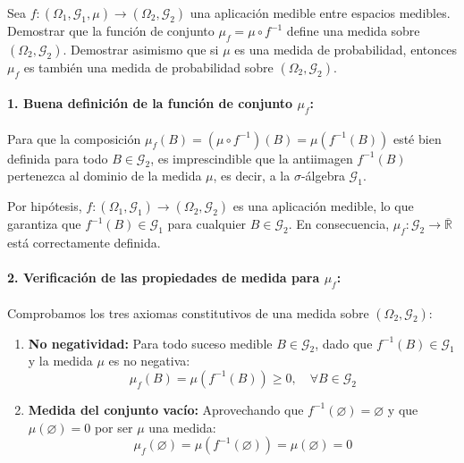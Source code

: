 \newpage
\begin{problema}
Sea $f : (\Omega_1, \mathcal{G}_1, \mu) \to (\Omega_2, \mathcal{G}_2)$ una aplicación medible entre espacios medibles. Demostrar que la función de conjunto $\mu_f = \mu \circ f^{-1}$ define una medida sobre $(\Omega_2, \mathcal{G}_2)$. Demostrar asimismo que si $\mu$ es una medida de probabilidad, entonces $\mu_f$ es también una medida de probabilidad sobre $(\Omega_2, \mathcal{G}_2)$.

\tcblower

\paragraph{1. Buena definición de la función de conjunto $\mu_f$:}
Para que la composición $\mu_f(B) = (\mu \circ f^{-1})(B) = \mu(f^{-1}(B))$ esté bien definida para todo $B \in \mathcal{G}_2$, es imprescindible que la antiimagen $f^{-1}(B)$ pertenezca al dominio de la medida $\mu$, es decir, a la $\sigma$-álgebra $\mathcal{G}_1$.

Por hipótesis, $f : (\Omega_1, \mathcal{G}_1) \to (\Omega_2, \mathcal{G}_2)$ es una aplicación medible, lo que garantiza que $f^{-1}(B) \in \mathcal{G}_1$ para cualquier $B \in \mathcal{G}_2$. En consecuencia, $\mu_f : \mathcal{G}_2 \to \overline{\mathbb{R}}$ está correctamente definida.

\paragraph{2. Verificación de las propiedades de medida para $\mu_f$:}
Comprobamos los tres axiomas constitutivos de una medida sobre $(\Omega_2, \mathcal{G}_2)$:

\begin{enumerate}[label=\arabic*.]
    \item \textbf{No negatividad:}
    Para todo suceso medible $B \in \mathcal{G}_2$, dado que $f^{-1}(B) \in \mathcal{G}_1$ y la medida $\mu$ es no negativa:
    \[
        \mu_f(B) = \mu(f^{-1}(B)) \ge 0, \quad \forall B \in \mathcal{G}_2
    \]

    \item \textbf{Medida del conjunto vacío:}
    Aprovechando que $f^{-1}(\varnothing) = \varnothing$ y que $\mu(\varnothing) = 0$ por ser $\mu$ una medida:
    \[
        \mu_f(\varnothing) = \mu(f^{-1}(\varnothing)) = \mu(\varnothing) = 0
    \]


\end{enumerate}
\end{problema}
